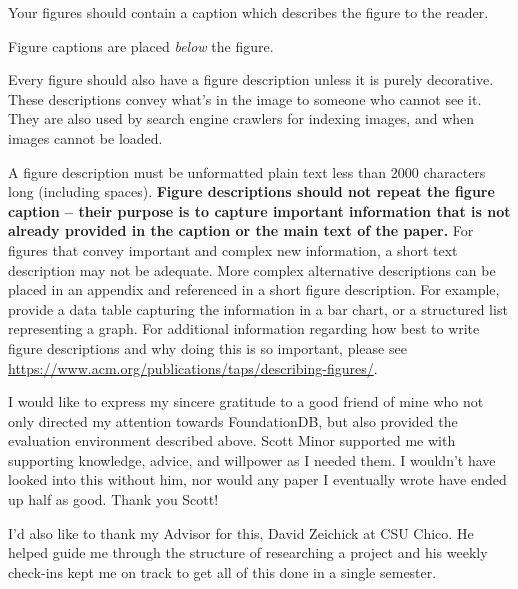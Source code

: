 \documentclass[sigconf]{acmart}
\begin{document}
Your figures should contain a caption which describes the figure to
the reader.

Figure captions are placed {\itshape below} the figure.

Every figure should also have a figure description unless it is purely
decorative. These descriptions convey what’s in the image to someone
who cannot see it. They are also used by search engine crawlers for
indexing images, and when images cannot be loaded.

A figure description must be unformatted plain text less than 2000
characters long (including spaces).  {\bfseries Figure descriptions
  should not repeat the figure caption – their purpose is to capture
  important information that is not already provided in the caption or
  the main text of the paper.} For figures that convey important and
complex new information, a short text description may not be
adequate. More complex alternative descriptions can be placed in an
appendix and referenced in a short figure description. For example,
provide a data table capturing the information in a bar chart, or a
structured list representing a graph.  For additional information
regarding how best to write figure descriptions and why doing this is
so important, please see
\url{https://www.acm.org/publications/taps/describing-figures/}.


\begin{acks}
I would like to express my sincere gratitude to a good friend of mine who not only directed my attention towards FoundationDB, but also provided the evaluation environment described above. Scott Minor supported me with supporting knowledge, advice, and willpower as I needed them. I wouldn't have looked into this without him, nor would any paper I eventually wrote have ended up half as good. Thank you Scott!

I'd also like to thank my Advisor for this, David Zeichick at CSU Chico. He helped guide me through the structure of researching a project and his weekly check-ins kept me on track to get all of this done in a single semester.
\end{acks}



\end{document}

